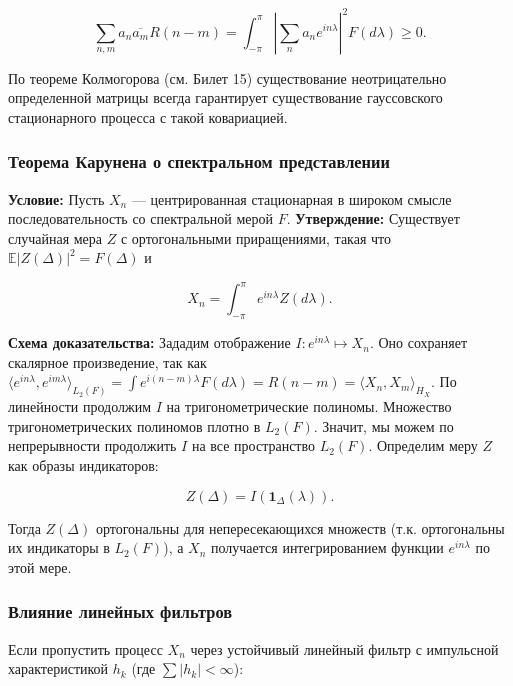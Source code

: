 \documentclass[
  11pt,
  a4paper,
]{article}
\begin{document}
\[
\sum_{n,m} a_n \overline{a_m} R(n-m) = \int_{-\pi}^{\pi} \left| \sum_n a_n e^{i n \lambda} \right|^2 F(d\lambda) \ge 0.
\]

По теореме Колмогорова (см. Билет 15) существование неотрицательно
определенной матрицы всегда гарантирует существование гауссовского
стационарного процесса с такой ковариацией.

\subsubsection{Теорема Карунена о спектральном
представлении}\label{ux442ux435ux43eux440ux435ux43cux430-ux43aux430ux440ux443ux43dux435ux43dux430-ux43e-ux441ux43fux435ux43aux442ux440ux430ux43bux44cux43dux43eux43c-ux43fux440ux435ux434ux441ux442ux430ux432ux43bux435ux43dux438ux438}

\textbf{Условие:} Пусть \(X_n\) --- центрированная стационарная в
широком смысле последовательность со спектральной мерой \(F\).
\textbf{Утверждение:} Существует случайная мера \(Z\) с ортогональными
приращениями, такая что \(\mathbb E|Z(\Delta)|^2 = F(\Delta)\) и

\[
X_n = \int_{-\pi}^{\pi} e^{i n \lambda} Z(d\lambda).
\]

\textbf{Схема доказательства:} Зададим отображение
\(I: e^{i n \lambda} \mapsto X_n\). Оно сохраняет скалярное
произведение, так как
\(\langle e^{i n \lambda}, e^{i m \lambda} \rangle_{L_2(F)} = \int e^{i(n-m)\lambda}F(d\lambda) = R(n-m) = \langle X_n, X_m \rangle_{H_X}\).
По линейности продолжим \(I\) на тригонометрические полиномы. Множество
тригонометрических полиномов плотно в \(L_2(F)\). Значит, мы можем по
непрерывности продолжить \(I\) на все пространство \(L_2(F)\). Определим
меру \(Z\) как образы индикаторов:

\[
Z(\Delta) = I(\mathbf{1}_\Delta(\lambda)).
\]

Тогда \(Z(\Delta)\) ортогональны для непересекающихся множеств (т.к.
ортогональны их индикаторы в \(L_2(F)\)), а \(X_n\) получается
интегрированием функции \(e^{in\lambda}\) по этой мере.

\subsubsection{Влияние линейных
фильтров}\label{ux432ux43bux438ux44fux43dux438ux435-ux43bux438ux43dux435ux439ux43dux44bux445-ux444ux438ux43bux44cux442ux440ux43eux432}

Если пропустить процесс \(X_n\) через устойчивый линейный фильтр с
импульсной характеристикой \(h_k\) (где \(\sum |h_k| < \infty\)):
\end{document}
